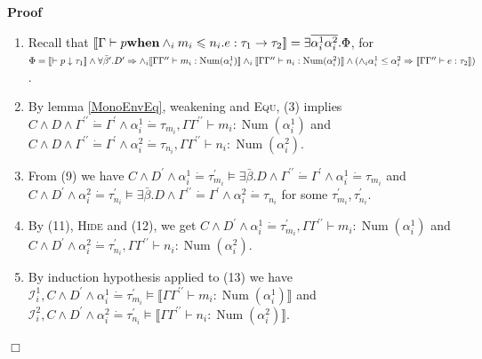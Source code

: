 \documentclass{article}
\newcommand{\tmname}[1]{\textsc{#1}}
\newcommand{\tmop}[1]{\ensuremath{\operatorname{#1}}}
\newcommand{\tmstrong}[1]{\textbf{#1}}
\newenvironment{proof}{\noindent\textbf{Proof\ }}{\hspace*{\fill}$\Box$\medskip}
\begin{document}
\begin{proof}
\begin{itemize}
\begin{enumerate}
      \item Recall that $\left\llbracket \Gamma \vdash p
      \text{{\tmstrong{when}}} \wedge_i m_i \leqslant n_i .e : \tau_1
      \rightarrow \tau_2 \right\rrbracket = \exists \overline{\alpha^1_i
      \alpha^2_i} . \Phi$, for $\Phi = \\
      \llbracket \vdash p \downarrow \tau_1 \rrbracket \wedge \forall
      \bar{\beta}^{\prime} .D^{\prime} \Rightarrow \wedge_i \llbracket \Gamma
      \Gamma^{\prime\prime} \vdash m_i : \tmop{Num} (\alpha^1_i) \rrbracket
      \wedge_i \llbracket \Gamma \Gamma^{\prime\prime} \vdash n_i : \tmop{Num}
      (\alpha^2_i) \rrbracket \wedge (\wedge_i \alpha^1_i \leq \alpha^2_i
      \Rightarrow \llbracket \Gamma \Gamma^{\prime\prime} \vdash e : \tau_2
      \rrbracket)$.
      
      \item By lemma \ref{MonoEnvEq}, weakening and {\tmname{Equ}}, (3)
      implies $C \wedge D \wedge \Gamma^{\prime\prime} \dot{=} \Gamma^{\prime}
      \wedge \alpha^1_i \dot{=} \tau_{m_i}, \Gamma \Gamma^{\prime\prime}
      \vdash m_i : \tmop{Num} (\alpha^1_i)$ and $C \wedge D \wedge
      \Gamma^{\prime\prime} \dot{=} \Gamma^{\prime} \wedge \alpha^2_i \dot{=}
      \tau_{n_i}, \Gamma \Gamma^{\prime\prime} \vdash n_i : \tmop{Num}
      (\alpha^2_i)$.
      
      \item From (9) we have $C \wedge D^{\prime} \wedge \alpha^1_i \dot{=}
      \tau_{m_i}^{\prime} \vDash \exists \bar{\beta} .D \wedge
      \Gamma^{\prime\prime} \dot{=} \Gamma^{\prime} \wedge \alpha^1_i \dot{=}
      \tau_{m_i}$ and $C \wedge D^{\prime} \wedge \alpha^2_i \dot{=}
      \tau_{n_i}^{\prime} \vDash \exists \bar{\beta} .D \wedge
      \Gamma^{\prime\prime} \dot{=} \Gamma^{\prime} \wedge \alpha^2_i \dot{=}
      \tau_{n_i}$ for some $\tau_{m_i}^{\prime}, \tau_{n_i}^{\prime}$.
      
      \item By (11), {\tmname{Hide}} and (12), we get $C \wedge D^{\prime}
      \wedge \alpha^1_i \dot{=} \tau_{m_i}^{\prime}, \Gamma
      \Gamma^{\prime\prime} \vdash m_i : \tmop{Num} (\alpha^1_i)$ and $C
      \wedge D^{\prime} \wedge \alpha^2_i \dot{=} \tau_{n_i}^{\prime}, \Gamma
      \Gamma^{\prime\prime} \vdash n_i : \tmop{Num} (\alpha^2_i)$.
      
      \item By induction hypothesis applied to (13) we have $\mathcal{I}_i^1,
      C \wedge D^{\prime} \wedge \alpha^1_i \dot{=} \tau_{m_i}^{\prime} \vDash
      \llbracket \Gamma \Gamma^{\prime\prime} \vdash m_i : \tmop{Num}
      (\alpha^1_i) \rrbracket$ and $\mathcal{I}_i^2, C \wedge D^{\prime}
      \wedge \alpha^2_i \dot{=} \tau_{n_i}^{\prime} \vDash \llbracket \Gamma
      \Gamma^{\prime\prime} \vdash n_i : \tmop{Num} (\alpha^2_i) \rrbracket$.
      

\end{enumerate}
\end{itemize}
\end{proof}
\end{document}
